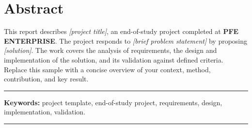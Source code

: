 \chapter*{Abstract}
\begingroup{}
This report describes \textit{[project title]}, an end-of-study project completed at \textbf{PFE ENTERPRISE}. The project responds to \textit{[brief problem statement]} by proposing \textit{[solution]}. The work covers the analysis of requirements, the design and implementation of the solution, and its validation against defined criteria. Replace this sample with a concise overview of your context, method, contribution, and key result.

\par\medskip
\noindent\rule{\textwidth}{0.5pt}\par\smallskip
{\textbf{Keywords:}} project template, end-of-study project, requirements, design, implementation, validation.\par\smallskip
\noindent\rule{\textwidth}{0.5pt}
\endgroup

